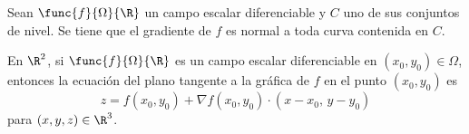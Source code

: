 \documentclass[a4,11pt]{aleph-notas}
\begin{document}
\begin{prop}
    Sean $\func{f}{\Omega}{\R}$ un campo escalar diferenciable y $C$ uno de sus conjuntos de nivel. Se tiene que el gradiente de $f$ es normal a toda curva contenida en $C$.
\end{prop}

\begin{advertencia}
    En $\R^2$, si $\func{f}{\Omega}{\R}$ es un campo escalar diferenciable en $(x_0,y_0)\in \Omega$, entonces la ecuación del plano tangente a la gráfica de $f$ en el punto $(x_0,y_0)$ es
    \[
        z = f(x_0,y_0) + \nabla f(x_0,y_0) \cdot (x-x_0,\, y-y_0)
    \]
    para $(x,y,z)\in\R^3$.
\end{advertencia}
\end{document}
